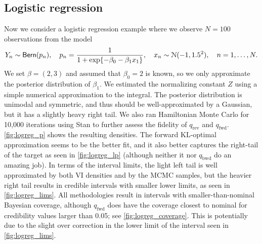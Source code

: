 \subsection{Logistic regression} \label{subsec:logreg}


Now we consider a logistic regression example where
we observe $N=100$ observations from the model
\[
  Y_n\sim{\sf{Bern}}(p_n),\quad
  p_n=\frac{1}{1+\exp\{-\beta_0-\beta_1 x_1\}},\quad
  x_n\sim\mathcal{N}(-1,1.5^2),\quad
  n=1,\dots,N.
\]
We set $\beta=(2,3)$ and assumed that $\beta_0=2$ is known,
so we only approximate the posterior distribution of $\beta_1$.
We estimated the normalizing constant $Z$ using
a simple numerical approximation to the integral.
The posterior distribution is unimodal and symmetric,
and thus should be well-approximated by a Gaussian,
but it has a slightly heavy right tail.
We also ran Hamiltonian Monte Carlo \citep{neal2011hmc}
for 10,000 iterations using Stan \citep{pystan}
to further assess the fidelity of
$q_\mathrm{rev}$ and $q_\mathrm{fwd}$.
\cref{fig:logreg_p} shows the resulting densities.
The forward KL-optimal approximation seems to be the better fit,
and it also better captures the right-tail of the target
as seen in \cref{fig:logreg_lp}
(although neither it nor $q_\mathrm{bwd}$ do an amazing job).
In terms of the interval limits,
the light left tail is well approximated by both VI densities
and by the MCMC samples,
but the heavier right tail results in
credible intervals with smaller lower limits,
as seen in \cref{fig:logreg_lims}.
All methodologies result in intervals with smaller-than-nominal Bayesian coverage,
although $q_\mathrm{fwd}$ does have the coverage closest to nominal
for credibility values larger than 0.05; see \cref{fig:logreg_coverage}.
This is potentially due to the slight over correction
in the lower limit of the interval seen in \cref{fig:logreg_lims}.


